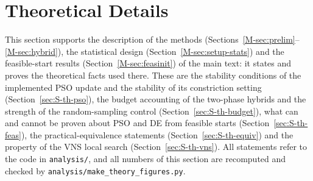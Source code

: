 \makeatletter
{}
\makeatother

\section{Theoretical Details}
\label{sec:S-theory}
This section supports the description of the methods (Sections~\ref{M-sec:prelim}--\ref{M-sec:hybrid}), the statistical design (Section~\ref{M-sec:setup-stats}) and the feasible-start results (Section~\ref{M-sec:feasinit}) of the main text: it states and proves the theoretical facts used there. These are the stability conditions of the implemented PSO update and the stability of its constriction setting (Section~\ref{sec:S-th-pso}), the budget accounting of the two-phase hybrids and the strength of the random-sampling control (Section~\ref{sec:S-th-budget}), what can and cannot be proven about PSO and DE from feasible starts (Section~\ref{sec:S-th-feas}), the practical-equivalence statements (Section~\ref{sec:S-th-equiv}) and the property of the VNS local search (Section~\ref{sec:S-th-vns}). All statements refer to the code in \texttt{analysis/}, and all numbers of this section are recomputed and checked by \texttt{analysis/make\_theory\_figures.py}.

